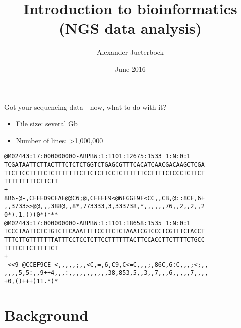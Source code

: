 \documentclass[presentation]{beamer}
\author{Alexander Jueterbock}
\date{June 2016}
\title{Introduction to bioinformatics (NGS data analysis)}
\begin{document}
\maketitle


\begin{frame}[fragile,label=sec-0-0-1]{Got your sequencing data - now, what to do with it?}
 \begin{footnotesize}
\begin{itemize}
\item File size: several Gb
\item Number of lines: >1,000,000
\end{itemize}

\begin{verbatim}
@M02443:17:000000000-ABPBW:1:1101:12675:1533 1:N:0:1
TCGATAATTCTTACTTTCTCTCTGGTCTGAGCGTTTCACATCAACGACAAGCTCGA
TTCTTCCTTTTCTCTTTTTTTCTTCTCTTCCTCTTTTTTCCTTTTCTCCCTCTTCT
TTTTTTTTTCTTCTT
+
8B6-@-,CFFED9CFAE@@C6;@,CFEEF9<@6FGGF9F<CC,,CB,@::8CF,6+
,,3733>>@@,,,388@,,8*,773333,3,333738,*,,,,,,76,,2,,2,,2
0*).1.))(0*)***
@M02443:17:000000000-ABPBW:1:1101:18658:1535 1:N:0:1
TCCCTAATTCTCTGTCTTCAAATTTTCCTTCTCTAAATCGTCCCTCGTTTCTACCT
TTTCTTGTTTTTTTATTTCCTCCTCTTCCTTTTTTACTTCCACCTTCTTTTCTGCC
TTTTCTTCTTTTTCT
+
-<<9-@CCEF9CE-<,,,,,;,,<C,=,6,C9,C<=C,,,;,86C,6:C,,,;<;,,
,,,,5,5:,,9++4,,,:,,,,,,,,,,,38,853,5,,3,,7,,,6,,,,,7,,,,
+0,()+++)11.*)*
\end{verbatim}

\end{footnotesize}
\end{frame}



\section{Background}
\label{sec-1}
\end{document}
